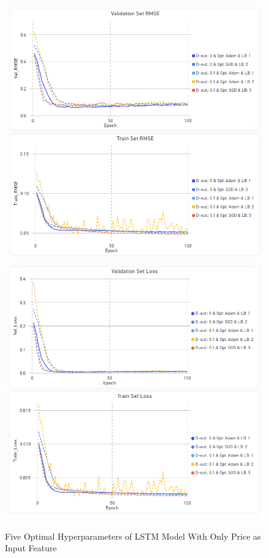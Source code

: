 \documentclass[11pt, a4paper]{article}
\begin{document}
\begin{figure}
    \centering
    \includegraphics[scale = 0.55]{Only_Price_Params_RMSE.png}
    \includegraphics[scale = 0.55]{Only_Price_Params_Loss.png}
    \caption{Five Optimal Hyperparameters of LSTM Model With Only Price as Input Feature}
    \label{fig:lstm_price_rmse_loss}
\end{figure}
\end{document}

